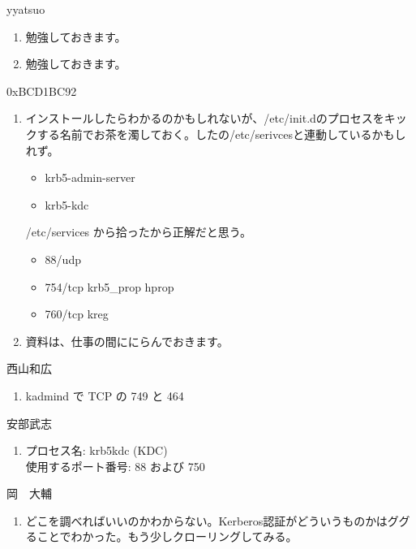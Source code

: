 \documentclass[mingoth,a4paper]{jsarticle}
\begin{document}
\begin{prework}{ yyatsuo }
  \begin{enumerate}
  \item 勉強しておきます。
  \item 勉強しておきます。
  \end{enumerate}
\end{prework}

\begin{prework}{ 0xBCD1BC92 }
  \begin{enumerate}
  \item インストールしたらわかるのかもしれないが、/etc/init.dのプロセスをキックする名前でお茶を濁しておく。したの/etc/serivcesと連動しているかもしれず。
    \begin{itemize}
    \item krb5-admin-server
    \item krb5-kdc
    \end{itemize}
    /etc/services から拾ったから正解だと思う。
    \begin{itemize}
    \item 88/udp
    \item 754/tcp         krb5\_prop hprop
    \item 760/tcp         kreg
    \end{itemize}
  \item 資料は、仕事の間ににらんでおきます。
  \end{enumerate}
\end{prework}

\begin{prework}{ 西山和広 }
  \begin{enumerate}
  \item kadmind で TCP の 749 と 464
  \end{enumerate}
\end{prework}

\begin{prework}{ 安部武志 }
  \begin{enumerate}
  \item プロセス名: krb5kdc (KDC)\\
    使用するポート番号: 88 および 750
  \end{enumerate}
\end{prework}

\begin{prework}{ 岡　大輔 }
  \begin{enumerate}
  \item どこを調べればいいのかわからない。Kerberos認証がどういうものかはググることでわかった。もう少しクローリングしてみる。
  \end{enumerate}
\end{prework}
\end{document}
